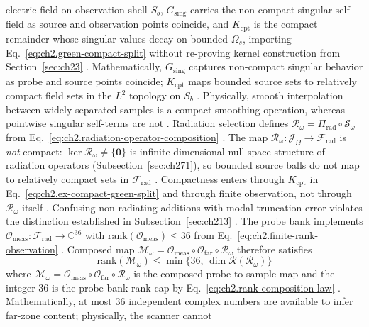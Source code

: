 electric field on observation shell $S_b$, $G_{\mathrm{sing}}$ carries the non-compact
singular self-field as source and observation points coincide, and $K_{\mathrm{cpt}}$ is the
compact remainder whose singular values decay on bounded $\Omega_s$,
importing Eq.~\eqref{eq:ch2.green-compact-split} without re-proving kernel construction from
Section~\ref{sec:ch23} \cite{stratton1941}.
Mathematically, \(G_{\mathrm{sing}}\) captures non-compact singular behavior as probe and source
points coincide; \(K_{\mathrm{cpt}}\) maps bounded source sets to relatively compact field sets in
the \(L^{2}\) topology on \(S_b\) . Physically, smooth interpolation between
widely separated samples is a compact smoothing operation, whereas pointwise singular self-terms
are not .
Radiation selection defines
\(\mathcal{R}_\omega=\Pi_{\mathrm{rad}}\circ\mathcal{S}_\omega\) from
Eq.~\eqref{eq:ch2.radiation-operator-composition} \cite{stratton1941}. The map
\(\mathcal{R}_\omega:\mathcal{J}_\Omega\to\mathcal{F}_{\mathrm{rad}}\) is \emph{not} compact:
\(\ker\mathcal{R}_\omega\neq\{\mathbf{0}\}\) is infinite-dimensional
null-space structure of radiation operators (Subsection~\ref{sec:ch271}), so bounded source balls do not map to
relatively compact sets in \(\mathcal{F}_{\mathrm{rad}}\) \cite{stratton1941}.
Compactness enters through \(K_{\mathrm{cpt}}\) in Eq.~\eqref{eq:ch2.ex-compact-green-split} and
through finite observation, not through \(\mathcal{R}_\omega\) itself \cite{stratton1941}. Confusing
non-radiating additions with modal truncation error violates the distinction established in
Subsection~\ref{sec:ch213} \cite{harrington2001}. The probe bank implements \(\mathcal{O}_{\mathrm{meas}}:\mathcal{F}_{\mathrm{rad}}\to\mathbb{C}^{36}\)
with \(\mathrm{rank}(\mathcal{O}_{\mathrm{meas}})\le 36\) from
Eq.~\eqref{eq:ch2.finite-rank-observation} \cite{stratton1941}. Composed map
\(\mathcal{M}_\omega=\mathcal{O}_{\mathrm{meas}}\circ\mathcal{O}_{\mathrm{far}}\circ\mathcal{R}_\omega\)
therefore satisfies
\begin{equation}
\label{eq:ch2.ex-compact-rank-cap}
\mathrm{rank}(\mathcal{M}_\omega)
\le
\min\{36,\,\dim\mathcal{R}(\mathcal{R}_\omega)\}
\end{equation}
where $\mathcal{M}_\omega=\mathcal{O}_{\mathrm{meas}}\circ\mathcal{O}_{\mathrm{far}}\circ\mathcal{R}_\omega$
is the composed probe-to-sample map and the integer $36$ is the probe-bank rank cap
by Eq.~\eqref{eq:ch2.rank-composition-law} \cite{stratton1941}. Mathematically, at most $36$
independent complex numbers are available to infer far-zone content; physically, the scanner cannot
